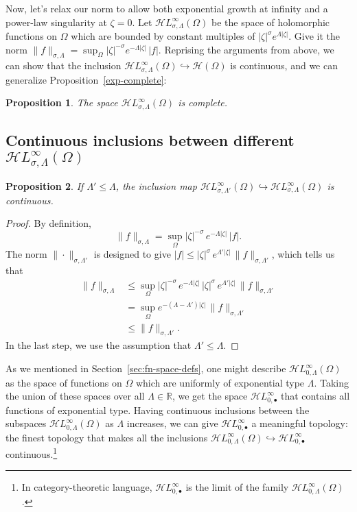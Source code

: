 \documentclass{article}
\theoremstyle{plain}
\newtheorem{prop}{Proposition}
\newcommand{\R}{\mathbb{R}}
\newcommand{\holo}{\mathcal{H}}
\newcommand{\singexp}[2]{\mathcal{H}L^\infty_{#1, #2}}
\newcommand{\singexpalg}[1]{\singexp{#1}{\bullet}}
\newcommand{\domain}{\Omega}
\begin{document}
Now, let's relax our norm to allow both exponential growth at infinity and a power-law singularity at $\zeta = 0$. Let $\singexp{\sigma}{\Lambda}(\Omega)$ be the space of holomorphic functions on $\Omega$ which are bounded by constant multiples of $|\zeta|^\sigma e^{\Lambda|\zeta|}$. Give it the norm $\|f\|_{\sigma,\Lambda} = \sup_\Omega |\zeta|^{-\sigma} e^{-\Lambda|\zeta|}\,|f|$. Reprising the arguments from above, we can show that the inclusion $\singexp{\sigma}{\Lambda}(\Omega) \hookrightarrow \holo(\Omega)$ is continuous, and we can generalize Proposition~\ref{exp-complete}:
\begin{prop}
The space $\singexp{\sigma}{\Lambda}(\Omega)$ is complete.
\end{prop}

\subsection{Continuous inclusions between different $\singexp{\sigma}{\Lambda}(\Omega)$}\label{sec:inclusions}
\begin{prop}\label{prop:inclus-ge-exp}
If $\Lambda'\leq\Lambda$, the inclusion map $\singexp{\sigma}{\Lambda'}(\Omega)\hookrightarrow \singexp{\sigma}{\Lambda}(\Omega)$ is continuous.
\end{prop}
\begin{proof}
By definition,
\[ \|f\|_{\sigma,\Lambda}=\sup_{\Omega} |\zeta|^{-\sigma}\,e^{-\Lambda |\zeta|}\, |f|. \]
The norm $\|\cdot\|_{\sigma, \Lambda'}$ is designed to give $|f| \le |\zeta|^\sigma\,e^{\Lambda'|\zeta|}\,\|f\|_{\sigma, \Lambda'}$, which tells us that
\begin{align*}
\|f\|_{\sigma,\Lambda} & \leq \sup_{\Omega} |\zeta|^{-\sigma}\,e^{-\Lambda |\zeta|}\,|\zeta|^\sigma\,e^{\Lambda'|\zeta|}\,\|f\|_{\sigma, \Lambda'}\\
&=\sup_{\Omega} e^{-(\Lambda-\Lambda') |\zeta|}\,\|f\|_{\sigma, \Lambda'}\\
&\leq \|f\|_{\sigma,\Lambda'}.
\end{align*}
In the last step, we use the assumption that $\Lambda' \le \Lambda$.
\end{proof}
As we mentioned in Section~\ref{sec:fn-space-defs}, one might describe $\singexp{0}{\Lambda}(\domain)$ as the space of functions on $\domain$ which are uniformly of exponential type $\Lambda$. Taking the union of these spaces over all $\Lambda \in \R$, we get the space $\singexpalg{0}$ that contains all functions of exponential type. Having continuous inclusions between the subspaces $\singexp{0}{\Lambda}(\domain)$ as $\Lambda$ increases, we can give $\singexpalg{0}$ a meaningful topology: the finest topology that makes all the inclusions $\singexp{0}{\Lambda}(\domain) \hookrightarrow \singexpalg{0}$ continuous.\footnote{In category-theoretic language, $\singexpalg{0}$ is the limit of the family $\singexp{0}{\Lambda}(\domain)$.}
\end{document}
